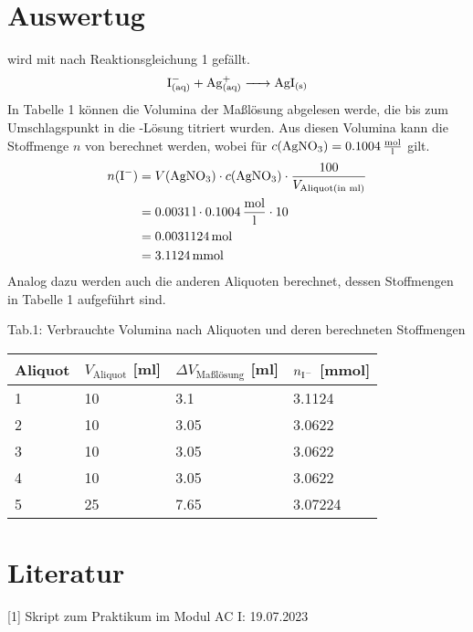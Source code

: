 \documentclass[12pt]{scrartcl} %
\begin{document}
\newpage

\section{Auswertug}
 wird mit  nach Reaktionsgleichung 1 gefällt.
\begin{equation}
    \ce{I^{-}_{(aq)} + Ag^{+}_{(aq)} -> AgI_{(s)}}
\end{equation}
In Tabelle 1 können die Volumina der Maßlösung abgelesen werde, die bis zum Umschlagspunkt in die -Lösung titriert wurden.
Aus diesen Volumina kann die Stoffmenge $n$ von  berechnet werden, wobei für $c(\ce{AgNO3}) = 0.1004\,\mathrm{\frac{mol}{l}}$ gilt.
\begin{align*}
    n(\ce{I^{-}}) &= V(\ce{AgNO3}) \cdot c(\ce{AgNO3}) \cdot \frac{100}{V_{\mathrm{Aliquot}(\text{in ml})}}\\
    &= 0.0031\,\mathrm{l} \cdot 0.1004\,\mathrm{\frac{mol}{l}} \cdot 10\\
    &= 0.0031124\,\mathrm{mol}\\
    &= 3.1124\,\mathrm{mmol}
\end{align*}
Analog dazu werden auch die anderen Aliquoten berechnet, dessen Stoffmengen in Tabelle 1 aufgeführt sind.\\

\begin{center}
    Tab.1: Verbrauchte Volumina nach Aliquoten und deren berechneten Stoffmengen\\
  \begin{tabular}{l l l l}
      \hline
      Aliquot & $V_{\mathrm{Aliquot}}$ [ml] & $\Delta V_{\text{Maßlösung}}$ [ml] & $n_{\ce{I^{-}}}$ [mmol]\\
      \hline
      1 & 10 & 3.1 & 3.1124\\
      2 & 10 & 3.05 & 3.0622\\
      3 & 10 & 3.05 & 3.0622\\
      4 & 10 & 3.05 & 3.0622\\
      5 & 25 & 7.65 & 3.07224\\
    \hline
  \end{tabular}
\end{center}

\section{Literatur}
[1] Skript zum Praktikum im Modul AC I: 19.07.2023
\end{document}
